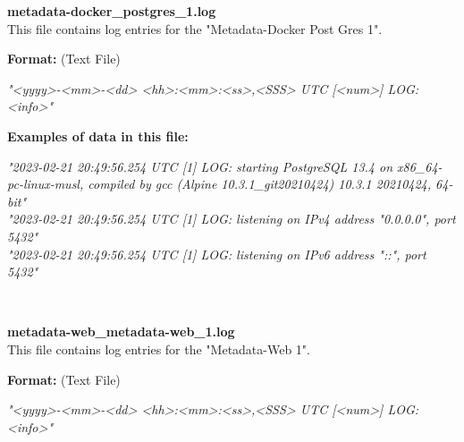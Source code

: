 \begin{description}
\begin{addmargin}[0em]{0em}
    \label{metadata-docker_postgres_1.log}
    \begin{addmargin}[1em]{0em} %
        \textbf{metadata-docker\_postgres\_1.log}\\
        This file contains log entries for the "Metadata-Docker Post Gres 1".
        \begin{addmargin}[1em]{0em}
            \textbf{Format:} (Text File)
            \begin{addmargin}[1em]{0em}
                \textit{"<yyyy>-<mm>-<dd> <hh>:<mm>:<ss>,<SSS> UTC [<num>] LOG: <info>"}
            \end{addmargin}
        \end{addmargin}
        \begin{addmargin}[1em]{0em}
            \textbf{Examples of data in this file:}
            \begin{addmargin}[1em]{0em}\textit{"2023-02-21 20:49:56.254 UTC [1] LOG:  starting PostgreSQL 13.4 on x86\_64-pc-linux-musl, compiled by gcc (Alpine 10.3.1\_git20210424) 10.3.1 20210424, 64-bit"\\
                "2023-02-21 20:49:56.254 UTC [1] LOG:  listening on IPv4 address "0.0.0.0", port 5432"\\
                "2023-02-21 20:49:56.254 UTC [1] LOG:  listening on IPv6 address "::", port 5432"}
            \end{addmargin}
        \end{addmargin}
    \end{addmargin} %
    \textbf{\\}

    \label{metadata-web_metadata-web_1.log}
    \begin{addmargin}[1em]{0em} %
        \textbf{metadata-web\_metadata-web\_1.log}\\
        This file contains log entries for the "Metadata-Web 1".
        \begin{addmargin}[1em]{0em}
            \textbf{Format:} (Text File)
            \begin{addmargin}[1em]{0em}
                \textit{"<yyyy>-<mm>-<dd> <hh>:<mm>:<ss>,<SSS> UTC [<num>] LOG: <info>"}
            \end{addmargin}
        \end{addmargin}
    \end{addmargin} %
    \textbf{\\}


\end{addmargin}
\end{description}
